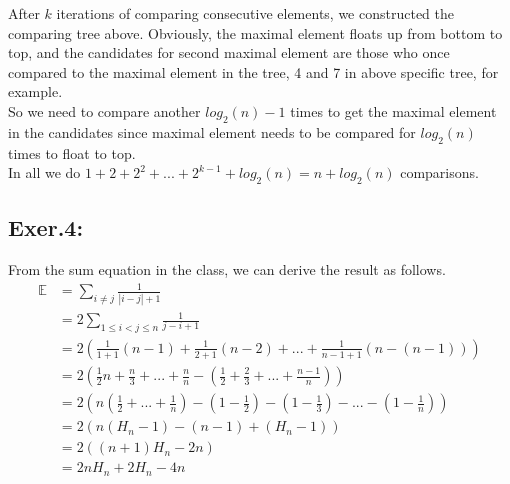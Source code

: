 \documentclass[UTF8]{ctexart}
\begin{document}
    \hspace*{1em}After $k$ iterations of comparing consecutive elements, we constructed the comparing tree above.
    Obviously, the maximal element floats up from bottom to top, and the candidates for second maximal element
    are those who once compared to the maximal element in the tree, 4 and 7 in above specific tree, for example.\\
    \hspace*{1em}So we need to compare another $log_2(n) - 1$ times to get the maximal element in the candidates since maximal element 
    needs to be compared for $log_2(n)$ times to float to top.\\
    \hspace*{1em}In all we do $1 + 2 + 2^2 +... + 2^{k - 1} + log_2(n) = n + log_2(n)$ comparisons.\\

\subsection*{Exer.4:}
    From the sum equation in the class, we can derive the result as follows.
\begin{align*}
    \mathbb{E}  & = \sum_{i \neq j} \frac{1}{|i - j| + 1}\\
                & = 2\sum_{1 \leq i < j \leq n} \frac{1}{j - i + 1}\\
                & = 2(\frac{1}{1 + 1}(n - 1) + \frac{1}{2 + 1}(n - 2) + ... + \frac{1}{n - 1 + 1}(n - (n - 1)))\\
                & = 2(\frac{1}{2}n + \frac{n}{3} + ... + \frac{n}{n} - (\frac{1}{2} + \frac{2}{3} + ... + \frac{n - 1}{n}))\\
                & = 2(n(\frac{1}{2} + ... + \frac{1}{n}) - (1 - \frac{1}{2}) - (1 - \frac{1}{3}) -... - (1 - \frac{1}{n}))\\
                & = 2(n(H_n - 1) - (n - 1) + (H_n -1))\\
                & = 2((n + 1)H_n - 2n)\\
                & = 2nH_n + 2H_n - 4n
\end{align*}
\end{document}
